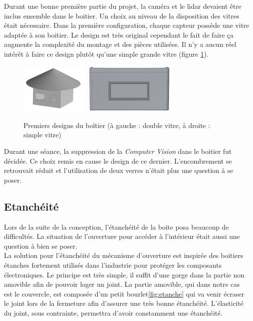 Durant une bonne première partie du projet, la caméra et le lidar devaient être inclus ensemble dans le boitier. 
Un choix au niveau de la disposition des vitres était nécessaire. Dans la première configuration, 
chaque capteur possède une vitre adaptée à son boitier. Le design est très original cependant le fait de faire ça 
augmente la complexité du montage et des pièces utilisées. Il n’y a aucun réel intérêt à faire ce design plutôt 
qu’une simple grande vitre (figure \ref{fig:boitierv1}).

\begin{figure}[H]
    \centering
    \includegraphics[width=0.3\textwidth]{Images/photos_PGA/Boiterv1.PNG}
    \includegraphics[width=0.4\textwidth]{Images/photos_PGA/boitierv2.PNG}
    \caption{Premiers designs du boîtier (à gauche : double vitre, à droite : simple vitre)}
    \label{fig:boitierv1}
\end{figure}

Durant une séance, la suppression de la \emph{Computer Vision} dans le boitier fut décidée. Ce choix remis en cause le design 
de ce dernier. L’encombrement se retrouvait réduit et l’utilisation de deux verres n’était plus une question à se 
poser. 

\subsection{Etanchéité}

Lors de la suite de la conception, l’étanchéité de la boite posa beaucoup de difficultés. La situation 
de l’ouverture pour accéder à l’intérieur était aussi une question à bien se poser. \\
La solution pour l’étanchéité du mécanisme d’ouverture est inspirée des boitiers étanches fortement 
utilisés dans l’industrie pour protéger les composants électroniques. Le principe est très simple, il 
suffit d’une gorge dans la partie non amovible afin de pouvoir loger un joint. La partie amovible, qui 
dans notre cas est le couvercle, est composée d’un petit bourlet\ref{fig:etanche} qui va venir écraser le joint lors de 
la fermeture afin d’assurer une très bonne étanchéité. L’élasticité du joint, sous contrainte, permettra 
d’avoir constamment une étanchéité. 

